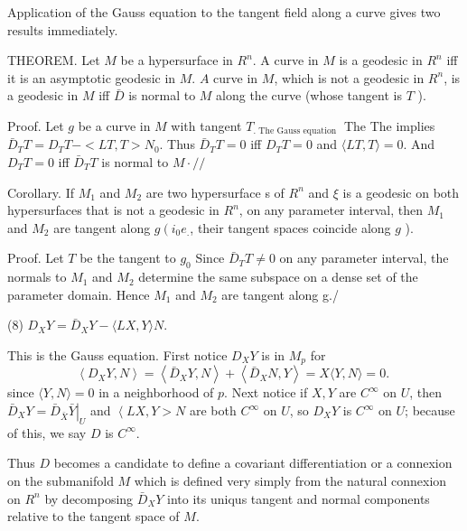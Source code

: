 \documentclass[10pt]{article}
\begin{document}
Application of the Gauss equation to the tangent field along a curve gives two results immediately.

THEOREM. Let $M$ be a hypersurface in $R^{n}$. A curve in $M$ is a geodesic in $R^{n}$ iff it is an asymptotic geodesic in $M$. $A$ curve in $M$, which is not a geodesic in $R^{n}$, is a geodesic in $M$ iff $\bar{D}$ is normal to $M$ along the curve (whose tangent is $T$ ).

Proof. Let $g$ be a curve in $M$ with tangent $T_{\text {. The Gauss equation }}$ The The implies $\bar{D}_{T} T=D_{T} T-<L T, T>N_{0}$. Thus $\bar{D}_{T} T=0$ iff $D_{T} T=0$ and $\langle L T, T\rangle=0$. And $D_{T} T=0$ iff $\bar{D}_{T} T$ is normal to $M \cdot / /$

Corollary. If $M_{1}$ and $M_{2}$ are two hypersurface s of $R^{n}$ and $\xi$ is a geodesic on both hypersurfaces that is not a geodesic in $R^{n}$, on any parameter interval, then $M_{1}$ and $M_{2}$ are tangent along $g\left(i_{0} e_{.}\right.$, their tangent spaces coincide along $g$ ).

Proof. Let $T$ be the tangent to $g_{0}$ Since $\bar{D}_{T} T \neq 0$ on any parameter interval, the normals to $M_{1}$ and $M_{2}$ determine the same subspace on a dense set of the parameter domain. Hence $M_{1}$ and $M_{2}$ are tangent along g./

(8) $D_{X} Y=\bar{D}_{X} Y-\langle L X, Y\rangle N$.

This is the Gauss equation. First notice $D_{X} Y$ is in $M_{p}$ for
$$
\left\langle D_{X} Y, N\right\rangle=\left\langle\bar{D}_{X} Y, N\right\rangle+\left\langle\bar{D}_{X} N, Y\right\rangle=X\langle Y, N\rangle=0 \text {. }
$$
since $\langle Y, N\rangle=0$ in a neighborhood of $p$. Next notice if $X, Y$ are $C^{\infty}$ on $U$, then $\bar{D}_{X} Y=\left.\bar{D}_{\bar{X}} \bar{Y}\right|_{U}$ and $\left\langle L X, Y>N\right.$ are both $C^{\infty}$ on $U$, so $D_{X} Y$ is $C^{\infty}$ on $U$; because of this, we say $D$ is $C^{\infty}$.

Thus $D$ becomes a candidate to define a covariant differentiation or a connexion on the submanifold $M$ which is defined very simply from the natural connexion on $R^{n}$ by decomposing $\bar{D}_{X} Y$ into its uniqus tangent and normal components relative to the tangent space of $M .$
\end{document}
